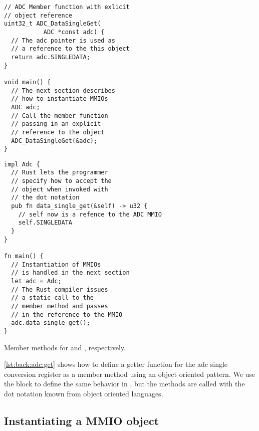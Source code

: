 \begin{listing}[H]
  \centering
  \begin{minipage}{0.47\textwidth}
  \begin{listing}
      \begin{verbatim}
// ADC Member function with exlicit
// object reference
uint32_t ADC_DataSingleGet(
           ADC *const adc) {
  // The adc pointer is used as
  // a reference to the this object
  return adc.SINGLEDATA;
}

void main() {
  // The next section describes
  // how to instantiate MMIOs
  ADC adc;
  // Call the member function
  // passing in an explicit
  // reference to the object
  ADC_DataSingleGet(&adc);
}
      \end{verbatim}
  \end{listing}
  \end{minipage}
  \hfill
  \begin{minipage}{0.47\textwidth}
  \begin{listing}
      \begin{verbatim}
impl Adc {
  // Rust lets the programmer
  // specify how to accept the
  // object when invoked with
  // the dot notation
  pub fn data_single_get(&self) -> u32 {
    // self now is a refence to the ADC MMIO
    self.SINGLEDATA
  }
}

fn main() {
  // Instantiation of MMIOs
  // is handled in the next section
  let adc = Adc;
  // The Rust compiler issues
  // a static call to the
  // member method and passes
  // in the reference to the MMIO
  adc.data_single_get();
}
      \end{verbatim}
  \end{listing}
  \end{minipage}
  \caption{Member methods for {\C} and {\rust}, respectively.}
  \label{lst:back:adc:get}

\end{listing}

\autoref{lst:back:adc:get} shows how to define a getter function for the \gls{adc} single conversion register as a member method using an object oriented pattern.
We use the  block to define the same behavior in {\rust}, but the methods are called with the dot notation known from object oriented languages.

\subsection{Instantiating a MMIO object}


